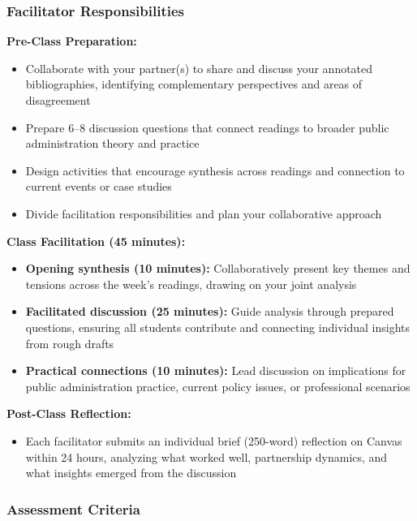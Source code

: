 \documentclass[12pt, letterpaper]{article}
\begin{document}
\subsubsection*{Facilitator Responsibilities}

\textbf{Pre-Class Preparation:}
\begin{itemize}
    \item Collaborate with your partner(s) to share and discuss your annotated bibliographies, identifying complementary perspectives and areas of disagreement
    \item Prepare 6--8 discussion questions that connect readings to broader public administration theory and practice
    \item Design activities that encourage synthesis across readings and connection to current events or case studies
    \item Divide facilitation responsibilities and plan your collaborative approach
\end{itemize}

\textbf{Class Facilitation (45 minutes):}
\begin{itemize}
    \item \textbf{Opening synthesis (10 minutes):} Collaboratively present key themes and tensions across the week's readings, drawing on your joint analysis
    \item \textbf{Facilitated discussion (25 minutes):} Guide analysis through prepared questions, ensuring all students contribute and connecting individual insights from rough drafts
    \item \textbf{Practical connections (10 minutes):} Lead discussion on implications for public administration practice, current policy issues, or professional scenarios
\end{itemize}

\textbf{Post-Class Reflection:}
\begin{itemize}
    \item Each facilitator submits an individual brief (250-word) reflection on Canvas within 24 hours, analyzing what worked well, partnership dynamics, and what insights emerged from the discussion
\end{itemize}

\subsubsection*{Assessment Criteria}
\end{document}
